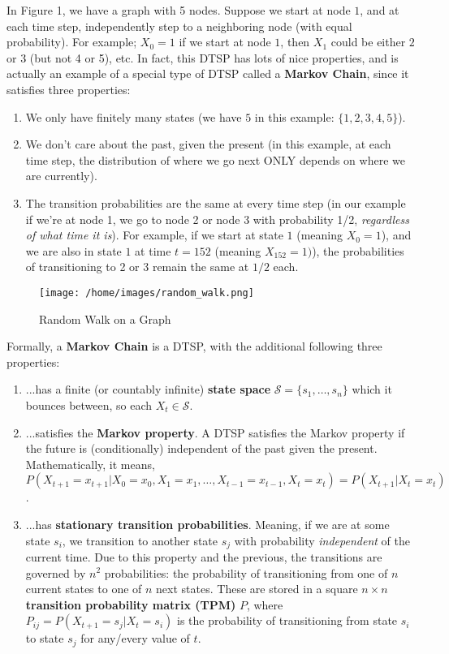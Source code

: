\documentclass[12pt]{article}
\renewcommand{\|}{\mid}
\begin{document}
\begin{enumerate}
In Figure 1, we have a graph with 5 nodes. Suppose we start at node $1$, and at each time step, independently step to a neighboring node (with equal probability). For example; $X_0=1$ if we start at node $1$, then $X_1$ could be either $2$ or $3$ (but not 4 or 5), etc. In fact, this DTSP has lots of nice properties, and is actually an example of a special type of DTSP called a \textbf{Markov Chain}, since it satisfies three properties:
\begin{enumerate}[label=\Roman*.]
    \item We only have finitely many states (we have $5$ in this example: $\{1,2,3,4,5\}$).
    \item We don’t care about the past, given the present (in this example, at each time step, the distribution of where we go next ONLY depends on where we are currently).
    \item The transition probabilities are the same at every time step (in our example if we're at node 1, we go to node 2 or node 3 with probability 1/2, \textit{regardless of what time it is}). For example, if we start at state $1$ (meaning $X_0=1$),  and we are also in state $1$ at time $t=152$ (meaning $X_{152}=1)$), the probabilities of transitioning to 2 or 3 remain the same at $1/2$ each.
\end{enumerate}
\begin{figure}[h]
\caption{Random Walk on a Graph}
\centering
\texttt{[image: /home/images/random\_walk.png]}
\end{figure}

Formally, a \textbf{Markov Chain} is a DTSP, with the additional following three properties:
\begin{enumerate}[label=\Roman*.]
    \item ...has a finite (or countably infinite) \textbf{state space} $\mathcal{S}=\{s_1,\dots,s_n\}$ which it bounces between, so each $X_t\in\mathcal{S}$.
    \item ...satisfies the \textbf{Markov property}. A DTSP satisfies the Markov property if the future is (conditionally) independent of the past given the present. Mathematically, it means, $P(X_{t+1}=x_{t+1}|X_0=x_0,X_1=x_1,\dots,X_{t-1}=x_{t-1},X_t=x_t)=P(X_{t+1}|X_t=x_t)$. 
    \item ...has \textbf{stationary transition probabilities}. Meaning, if we are at some state $s_i$, we transition to another state $s_j$ with probability \textit{independent} of the current time. Due to this property and the previous, the transitions are governed by $n^2$ probabilities: the probability of transitioning from one of $n$ current states to one of $n$ next states. These are stored in a square $n\times n$ \textbf{transition probability matrix (TPM)} $P$, where $P_{ij}=P(X_{t+1}=s_j|X_t=s_i)$ is the probability of transitioning from state $s_i$ to state $s_j$ for any/every value of $t$.
\end{enumerate}


\end{enumerate}
\end{document}
